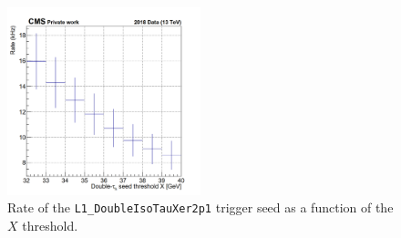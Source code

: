 \documentclass[../main.tex]{subfiles}
\begin{document}
\begin{figure}[h!]
\begin{center}
\includegraphics[width=0.5\textwidth]{Images/plot2D_ditau_sym_323755}
\end{center}
\caption{Rate of the \texttt{L1\_DoubleIsoTauXer2p1} trigger seed as a function of the $X$ threshold.}
\label{hh:fig:trig_ditau32_rate}
\end{figure}
\end{document}
